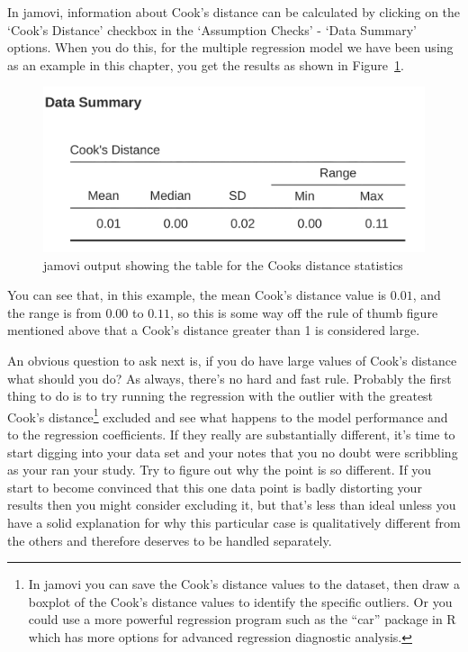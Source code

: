 \documentclass[
  a4paper,
]{book}
\begin{document}
In jamovi, information about Cook's distance can be calculated by
clicking on the `Cook's Distance' checkbox in the `Assumption Checks' -
`Data Summary' options. When you do this, for the multiple regression
model we have been using as an example in this chapter, you get the
results as shown in Figure~\ref{fig-fig12-27}.

\begin{figure}

\includegraphics[width=1\textwidth,height=\textheight]{images/fig12-27.png} \hfill{}

\caption{\label{fig-fig12-27}jamovi output showing the table for the
Cooks distance statistics}

\end{figure}

You can see that, in this example, the mean Cook's distance value is
\(0.01\), and the range is from \(0.00\) to \(0.11\), so this is some
way off the rule of thumb figure mentioned above that a Cook's distance
greater than 1 is considered large.

An obvious question to ask next is, if you do have large values of
Cook's distance what should you do? As always, there's no hard and fast
rule. Probably the first thing to do is to try running the regression
with the outlier with the greatest Cook's distance\footnote{In jamovi
  you can save the Cook's distance values to the dataset, then draw a
  boxplot of the Cook's distance values to identify the specific
  outliers. Or you could use a more powerful regression program such as
  the ``car'' package in R which has more options for advanced
  regression diagnostic analysis.} excluded and see what happens to the
model performance and to the regression coefficients. If they really are
substantially different, it's time to start digging into your data set
and your notes that you no doubt were scribbling as your ran your study.
Try to figure out why the point is so different. If you start to become
convinced that this one data point is badly distorting your results then
you might consider excluding it, but that's less than ideal unless you
have a solid explanation for why this particular case is qualitatively
different from the others and therefore deserves to be handled
separately.
\end{document}
